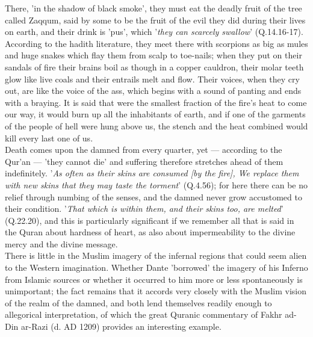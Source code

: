 \documentclass[10pt, twoside]{book}
\begin{document}
There, 'in the shadow of black smoke', they must eat the deadly fruit of the tree called Zaqqum, said 
by some to be the fruit of the evil they did during their lives on earth, and their drink is 'pus', 
which '\emph{they can scarcely swallow}' (Q.14.16\hyp{}17). According to the hadith literature, they meet there 
with scorpions as big as mules and huge snakes which flay them from scalp to toe\hyp{}nails; when they put 
on their sandals of fire their brains boil as though in a copper cauldron, their molar teeth glow 
like live coals and their entrails melt and flow. Their voices, when they cry out, are like the voice 
of the ass, which begins with a sound of panting and ends with a braying. It is said that were the 
smallest fraction of the fire's heat to come our way, it would burn up all the inhabitants of earth, 
and if one of the garments of the people of hell were hung above us, the stench and the heat combined 
would kill every last one of us. \\

Death comes upon the damned from every quarter, yet --- according to the Qur'an --- 'they cannot die' and 
suffering therefore stretches ahead of them indefinitely. '\emph{As often as their skins are consumed [by 
the fire], We replace them with new skins that they may taste the torment}' (Q.4.56); for here there 
can be no relief through numbing of the senses, and the damned never grow accustomed to their 
condition. '\emph{That which is within them, and their skins too, are melted}' (Q.22.20), and this is 
particularly significant if we remember all that is said in the Quran about hardness of heart, as 
also about impermeability to the divine mercy and the divine message. \\

There is little in the Muslim imagery of the infernal regions that could seem alien to the Western 
imagination. Whether Dante 'borrowed' the imagery of his Inferno from Islamic sources or whether it 
occurred to him more or less spontaneously is unimportant; the fact remains that it accords very 
closely with the Muslim vision of the realm of the damned, and both lend themselves readily enough to 
allegorical interpretation, of which the great Quranic commentary of Fakhr ad\hyp{}Din ar\hyp{}Razi (d. AD 
1209) provides an interesting example. \\
\end{document}
